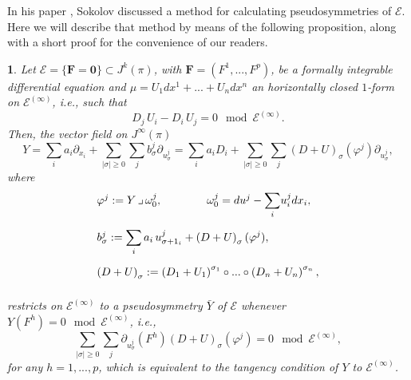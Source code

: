 \documentclass[12pt,english]{elsarticle}
\theoremstyle{plain}
\theoremstyle{plain}
\newtheorem{prop}[thm]{\protect\propositionname}
\theoremstyle{remark}
\theoremstyle{plain}
\theoremstyle{definition}
\theoremstyle{definition}
\providecommand{\propositionname}{Proposition}
\begin{document}
In his paper \cite{Sokolov}, Sokolov discussed a method for calculating
pseudosymmetries of $\mathcal{E}$. Here we will describe that method by
means of the following proposition, along with a short proof for the convenience
of our readers.
%
\begin{prop}
\label{prop:pseudoE}%
Let $\mathcal{E}=\{\mathbf{F=0}\}\subset J^{k}(\pi )$, with
$\text{$\mathbf{F}$}=(F^{1},...,F^{p})$, be a formally integrable
differential equation and $\mu =U_{1}dx^{1}+...+U_{n}dx^{n}$ an horizontally
closed $1$-form on $\mathcal{E}^{(\infty )}$, i.e., such that
%
\begin{equation}
D_{j}\,U_{i}-D_{i}\,U_{j}=0\mod{\mathcal{E}^{(\infty )}}.
\label{eq:U_psym}
\end{equation}
%
Then, the vector field on $J^{\infty}(\pi )$
%
\begin{equation}
Y=\sum _{i}a_{i}\partial _{x_{i}}+\sum _{|\sigma |\geq 0}\sum _{j}b_{
\sigma}^{j}\partial _{u_{\sigma}^{j}}=\sum _{i}a_{i}D_{i}+\sum _{|
\sigma |\geq 0}\sum _{j}\left (D+U\right )_{\sigma}(\varphi ^{j})
\partial _{u_{\sigma}^{j}},
\label{eq:Y_pseudo_int}
\end{equation}
%
where
%
\begin{equation*}
%
\begin{array}{l}
\varphi ^{j}:=Y\,\lrcorner \,\omega _{0}^{j},\qquad \qquad \omega _{0}^{j}=du^{j}-{
\displaystyle \sum _{i}}u_{i}^{j}dx_{i},
\vspace{10pt}
\\
b_{\sigma}^{j}:={\displaystyle \sum _{i}a_{i}\,u_{\sigma +1_{i}}^{j}+
\left (D+U\right )_{\sigma}(\varphi ^{j})},
\vspace{10pt}
\\
\left (D+U\right )_{\sigma}:=\left (D_{1}+U_{1}\right )^{\sigma _{1}}
\circ ...\circ \left (D_{n}+U_{n}\right )^{\sigma _{n}},
\vspace{10pt}
\end{array}
%
\end{equation*}
%
restricts on $\mathcal{E}^{(\infty )}$ to a pseudosymmetry $\bar{Y}$ of
$\mathcal{E}$ whenever $Y(F^{h})=0\mod{\mathcal{E}^{(\infty )}}$, i.e.,
%
\begin{equation}
\sum _{|\sigma |\geq 0}\sum _{j}\partial _{u_{\sigma}^{j}}\left (F^{h}
\right )\left (D+U\right )_{\sigma}(\varphi ^{j})=0
\mod{\mathcal{E}^{(\infty )}},
\label{eq:Y_tang}
\end{equation}
%
for any $h=1,...,p$, which is equivalent to the tangency condition of
$Y$ to $\mathcal{E}^{(\infty )}$.
\end{prop}
\end{document}
